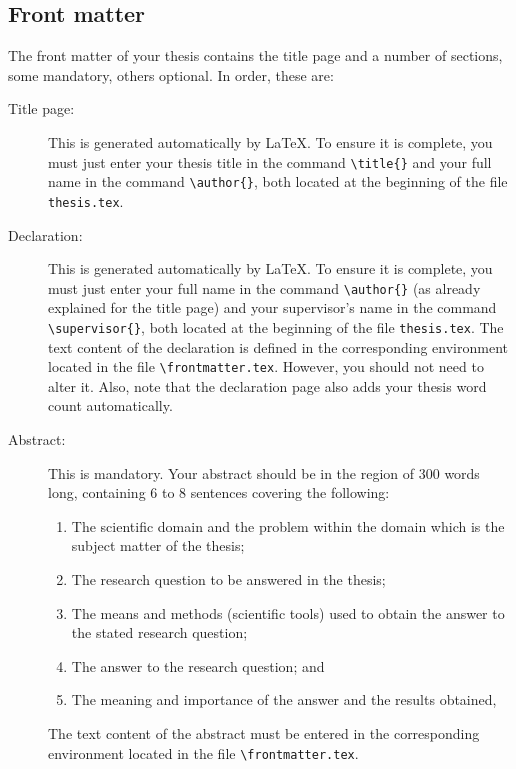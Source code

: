\documentclass[11pt,twoside,openright]{report}
\newcommand{\supervisor}{[Prof/Dr] Supervisor Name}
\begin{document}
\subsection{Front matter}
\label{subsec:frontmatter}

The front matter of your thesis contains the title page and a number of sections, some mandatory, others optional. 
In order, these are:
\begin{description}
    \item [Title page:] This is generated automatically by \LaTeX{}. To ensure it is complete, you must just enter your thesis title in the command \verb|\title{}| and your full name in the command \verb|\author{}|, both located at the beginning of the file \verb|thesis.tex|.
    
    \item [Declaration:] This is generated automatically by \LaTeX{}. To ensure it is complete, you must just enter your full name in the command \verb|\author{}| (as already explained for the title page) and your supervisor's name in the command \verb|\supervisor{}|, both located at the beginning of the file \verb|thesis.tex|. The text content of the declaration is defined in the corresponding environment located in the file \verb|\frontmatter.tex|. However, you should not need to alter it. Also, note that the declaration page also adds your thesis word count automatically.
    
    \item [Abstract:] This is mandatory. Your abstract should be in the region of 300 words long, containing 6 to 8 sentences covering the following:
    \begin{enumerate}[noitemsep]
        \item The scientific domain and the problem within the domain which is the subject matter of the thesis;
        \item The research question to be answered in the thesis;
        \item The means and methods (scientific tools) used to obtain the answer to the stated research question;
        \item The answer to the research question; and
        \item The meaning and importance of the answer and the results obtained,
    \end{enumerate}
    The text content of the abstract must be entered in the corresponding environment located in the file \verb|\frontmatter.tex|.
    

\end{description}
\end{document}
